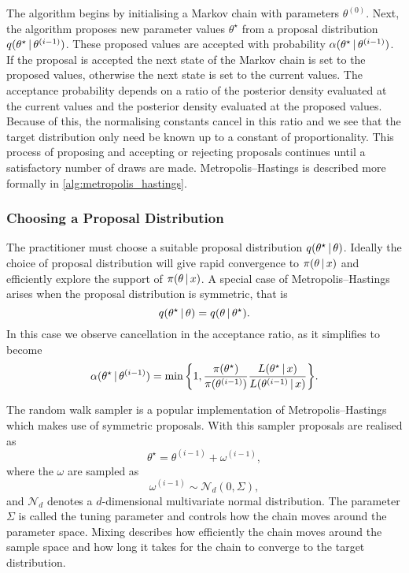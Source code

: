 The algorithm begins by initialising a Markov chain with parameters $\theta^{(0)}$.
Next, the algorithm proposes new parameter values $\theta^\star$ from a proposal
distribution $q(\theta^\star \,|\, \theta^{(i-1)})$. These proposed values are
accepted with probability $\alpha(\theta^\star \,|\, \theta^{(i-1)})$.  If the
proposal is accepted the next state of the Markov chain is set to the proposed values,
otherwise the next state is set to the current values.  The acceptance probability depends
on a ratio of the posterior density evaluated at the current values and the posterior
density evaluated at the proposed values.  Because of this, the normalising constants
cancel in this ratio and we see that the target distribution only need be
known up to a constant of proportionality.  This process of proposing and accepting or
rejecting proposals continues until a satisfactory number of draws are made.
Metropolis--Hastings is described more formally in \cref{alg:metropolis_hastings}.

\subsubsection{Choosing a Proposal Distribution}
\label{ssec:proposal_distribution}

The practitioner must choose a suitable proposal distribution $q(\theta^\star \,|\,
\theta)$. Ideally the choice of proposal distribution will give rapid convergence to
$\pi(\theta \,|\,  x)$ and efficiently explore the support of $\pi(\theta
\,|\,  x)$. A special case of Metropolis--Hastings arises when the proposal
distribution is symmetric, that is
\begin{equation*}
  q(\theta^\star \,|\, \theta) = q(\theta \,|\, \theta^\star).
\end{equation*}
In this case we observe cancellation in the acceptance ratio, as it simplifies to become
\begin{equation*}
  \alpha({\theta}^\star \given \theta^{(i-1)})
    = \text{min}\,\bigg\{1,
                        \frac{\pi(\theta^\star)}{\pi(\theta^{(i-1)})}%
                        \frac{L(\theta^\star \given  x)}%
                        {L(\theta^{(i-1)} \given  x)}
                  \bigg\}.
\end{equation*}

The random walk sampler is a popular implementation of Metropolis--Hastings which makes
use of symmetric proposals. With this sampler proposals are realised as
\begin{equation*}
  \theta^\star = \theta^{(i-1)} +  \omega^{(i-1)},
\end{equation*}
where the $ \omega$ are sampled as
\begin{equation*}
   \omega^{(i-1)} \sim \mathcal{N}_d( 0, \Sigma),
\end{equation*}
and $\mathcal{N}_d$ denotes a $d$-dimensional multivariate normal distribution. The
parameter $\Sigma$ is called the tuning parameter and controls how the chain moves around
the parameter space. Mixing describes how efficiently the chain moves around the sample
space and how long it takes for the chain to converge to the target distribution.

